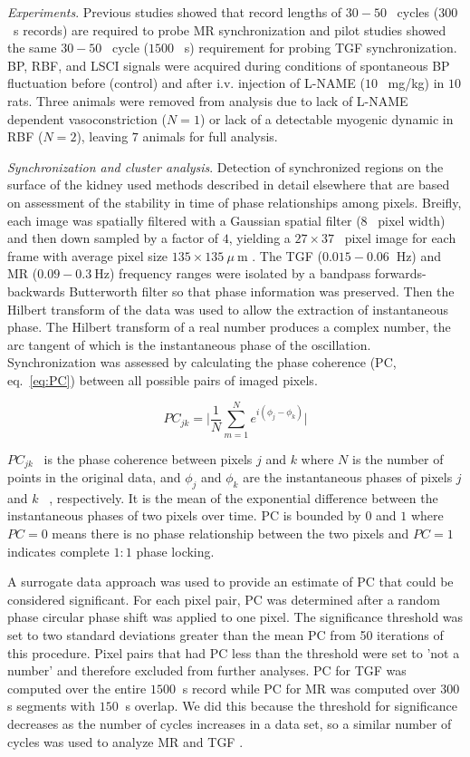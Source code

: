 	\emph{Experiments}. Previous studies showed that record lengths of $30-50$ \ cycles ($300$ \ s records) are required to probe MR synchronization \cite{Scully14} and pilot studies showed the same $30-50$ \ cycle ($1500$ \ s) requirement for probing TGF synchronization. BP, RBF, and LSCI signals were acquired during conditions of spontaneous BP fluctuation before (control) and after i.v. injection of L-NAME ($10$ \ mg/kg) in $10$ rats. Three animals were removed from analysis due to lack of L-NAME dependent vasoconstriction ($N = 1$) or lack of a detectable myogenic dynamic in RBF ($N=2$), leaving $7$ animals for full analysis. 
	
	\emph{Synchronization and cluster analysis}. Detection of synchronized regions on the surface of the kidney used methods described in detail elsewhere \cite{Scully14} that are based on assessment of the stability in time of phase relationships among pixels. Breifly, each image was spatially filtered with a Gaussian spatial filter ($8$ \ pixel width) and then down sampled by a factor of $4$, yielding a $27\times 37$ \ pixel image for each frame with average pixel size $135\times 135 \ \mu \ $m \cite{Scully14,Scully13}. The TGF ($0.015-0.06 \ $ Hz) and MR ($0.09-0.3 \ $Hz) frequency ranges were isolated by a bandpass forwards-backwards Butterworth filter so that phase information was preserved. Then the Hilbert transform of the data was used to allow the extraction of instantaneous phase. The Hilbert transform of a real number produces a complex number, the arc tangent of which is the instantaneous phase of the oscillation. Synchronization was assessed by calculating the phase coherence (PC, eq.~\ref{eq:PC}) between all possible pairs of imaged pixels.

\begin{equation}	
PC_{jk} = \lvert \frac{1}{N} \sum \limits_{m=1}^{N} e ^{i(\phi_j - \phi_k)} \rvert
\label{eq:PC}
\end{equation}

	$PC_{jk}$ \ is the phase coherence between pixels $j$ and $k$ where $N$ is the number of points in the original data, and $\phi _{j}$ and $\phi _{k}$ are the instantaneous phases of pixels $j$ and $k$ \ , respectively. It is the mean of the exponential difference between the instantaneous phases of two pixels over time. PC is bounded by $0$ and $1$ where $PC=0$ means there is no phase relationship between the two pixels and $PC=1$ indicates complete $1:1$ phase locking.

	A surrogate data approach was used to provide an estimate of PC that could be considered significant. For each pixel pair, PC was determined after a random phase circular phase shift was applied to one pixel. The significance threshold was set to two standard deviations greater than the mean PC from 50 iterations of this procedure. Pixel pairs that had PC less than the threshold were set to 'not a number' and therefore excluded from further analyses. PC for TGF was computed over the entire $1500 \ $ s record while PC for MR was computed over $300 \ $ s segments with $150 \ $ s overlap. We did this because the threshold for significance decreases as the number of cycles increases in a data set, so a similar number of cycles was used to analyze MR and TGF \cite{Scully14}.
	
